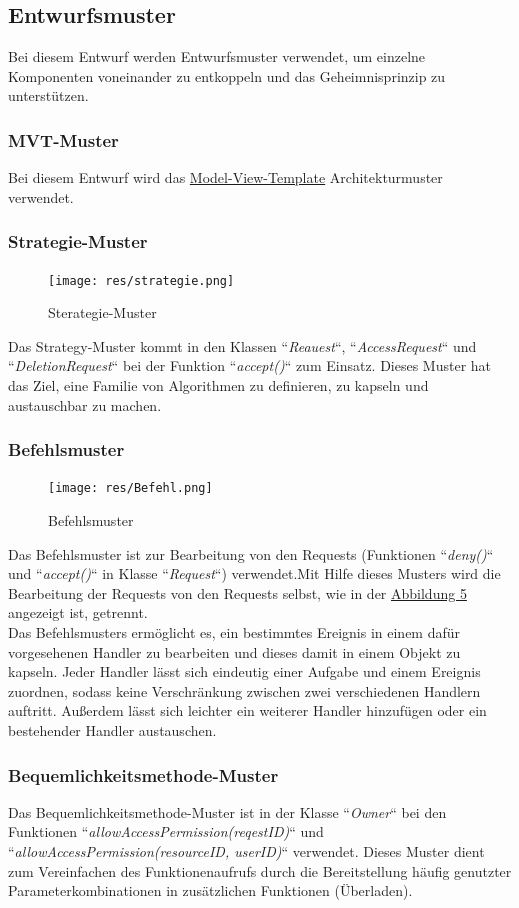 \documentclass[parskip=full,11pt]{scrartcl}
\begin{document}
 \subsection{Entwurfsmuster}
 Bei diesem Entwurf werden Entwurfsmuster verwendet, um einzelne Komponenten voneinander zu entkoppeln und das \gls{Geheimnisprinzip} zu unterstützen. 
 \subsubsection*{MVT-Muster} 
 Bei diesem Entwurf wird das  \hyperref[MVT]{Model-View-Template} Architekturmuster verwendet.
 \subsubsection*{Strategie-Muster}
 \begin{figure}[ht!]
 	\centering
 	\texttt{[image: res/strategie.png]}
 	\caption{Sterategie-Muster}
 \end{figure}
 Das Strategy-Muster kommt in den Klassen ``\textit{Reauest}``, ``\textit{AccessRequest}`` und ``\textit{DeletionRequest}`` bei der Funktion ``\textit{accept()}`` zum Einsatz. Dieses Muster hat das Ziel, eine Familie von Algorithmen zu definieren, zu kapseln und austauschbar zu machen.
 
 \subsubsection*{Befehlsmuster}
 \begin{figure}[ht!]
 	\centering
 	\texttt{[image: res/Befehl.png]}
 	\caption{Befehlsmuster}
 	\label{Befehl}
 \end{figure}

 Das Befehlsmuster ist zur Bearbeitung von den Requests (Funktionen ``\textit{deny()}`` und ``\textit{accept()}`` in Klasse ``\textit{Request}``) verwendet.Mit Hilfe dieses Musters wird die Bearbeitung der Requests von den Requests selbst, wie in der   \hyperref[Befehl]{Abbildung 5} angezeigt ist, getrennt.\\
 Das Befehlsmusters ermöglicht es, ein bestimmtes Ereignis in einem dafür vorgesehenen Handler
 zu bearbeiten und dieses damit in einem Objekt zu kapseln. Jeder Handler lässt sich eindeutig einer Aufgabe
 und einem Ereignis zuordnen, sodass keine Verschränkung zwischen zwei verschiedenen Handlern auftritt.
 Außerdem lässt sich leichter ein weiterer Handler hinzufügen oder ein bestehender Handler austauschen.
 
 \subsubsection*{Bequemlichkeitsmethode-Muster}
 Das Bequemlichkeitsmethode-Muster ist in der Klasse ``\textit{Owner}``
 bei den Funktionen ``\textit{allowAccessPermission(reqestID)}`` und ``\textit{allowAccessPermission(resourceID, userID)}`` verwendet. Dieses Muster dient zum Vereinfachen des Funktionenaufrufs durch die Bereitstellung häufig
genutzter Parameterkombinationen in zusätzlichen Funktionen
(Überladen).
\end{document}
